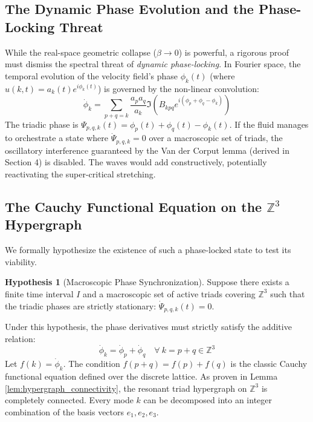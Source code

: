 \documentclass[12pt,a4paper]{article}
\theoremstyle{plain}
\theoremstyle{definition}
\newtheorem{hypothesis}[theorem]{Hypothesis}
\theoremstyle{remark}
\begin{document}
\subsection{The Dynamic Phase Evolution and the Phase-Locking Threat}
While the real-space geometric collapse ($\beta \to 0$) is powerful, a rigorous proof must dismiss the spectral threat of \textit{dynamic phase-locking}. In Fourier space, the temporal evolution of the velocity field's phase $\phi_k(t)$ (where $\hat{u}(k,t) = a_k(t) e^{i\phi_k(t)}$) is governed by the non-linear convolution:
\begin{equation}
    \dot{\phi}_k = \sum_{p+q=k} \frac{a_p a_q}{a_k} \Im \left( B_{kpq} e^{i(\phi_p + \phi_q - \phi_k)} \right)
\end{equation}
The triadic phase is $\Psi_{p,q,k}(t) = \phi_p(t) + \phi_q(t) - \phi_k(t)$. If the fluid manages to orchestrate a state where $\dot{\Psi}_{p,q,k} = 0$ over a macroscopic set of triads, the oscillatory interference guaranteed by the Van der Corput lemma (derived in Section 4) is disabled. The waves would add constructively, potentially reactivating the super-critical stretching. 

\subsection{The Cauchy Functional Equation on the $\mathbb{Z}^3$ Hypergraph}
We formally hypothesize the existence of such a phase-locked state to test its viability.
\begin{hypothesis}[Macroscopic Phase Synchronization]
Suppose there exists a finite time interval $I$ and a macroscopic set of active triads covering $\mathbb{Z}^3$ such that the triadic phases are strictly stationary: $\dot{\Psi}_{p,q,k}(t) = 0$.
\end{hypothesis}
Under this hypothesis, the phase derivatives must strictly satisfy the additive relation:
\begin{equation}
    \dot{\phi}_k = \dot{\phi}_p + \dot{\phi}_q \quad \forall \ k = p + q \in \mathbb{Z}^3
\end{equation}
Let $f(k) = \dot{\phi}_k$. The condition $f(p+q) = f(p) + f(q)$ is the classic Cauchy functional equation defined over the discrete lattice. As proven in Lemma \ref{lem:hypergraph_connectivity}, the resonant triad hypergraph on $\mathbb{Z}^3$ is completely connected. Every mode $k$ can be decomposed into an integer combination of the basis vectors $e_1, e_2, e_3$. 
\end{document}
